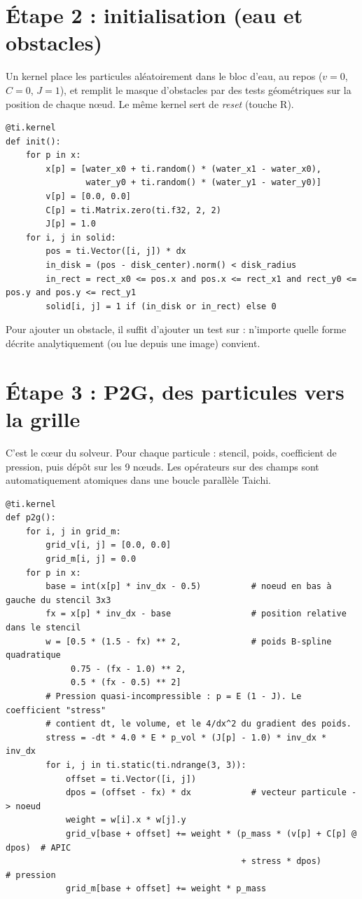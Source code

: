 \documentclass[11pt,a4paper]{article}
\newcommand{\code}[1]{\texttt{\detokenize{#1}}}
\begin{document}
\section{Étape 2 : initialisation (eau et obstacles)}

Un kernel place les particules aléatoirement dans le bloc d'eau, au repos ($v = 0$,
$C = 0$, $J = 1$), et remplit le masque d'obstacles par des tests géométriques sur la
position de chaque n\oe ud. Le même kernel sert de \emph{reset} (touche R).

\begin{lstlisting}
@ti.kernel
def init():
    for p in x:
        x[p] = [water_x0 + ti.random() * (water_x1 - water_x0),
                water_y0 + ti.random() * (water_y1 - water_y0)]
        v[p] = [0.0, 0.0]
        C[p] = ti.Matrix.zero(ti.f32, 2, 2)
        J[p] = 1.0
    for i, j in solid:
        pos = ti.Vector([i, j]) * dx
        in_disk = (pos - disk_center).norm() < disk_radius
        in_rect = rect_x0 <= pos.x and pos.x <= rect_x1 and rect_y0 <= pos.y and pos.y <= rect_y1
        solid[i, j] = 1 if (in_disk or in_rect) else 0
\end{lstlisting}

Pour ajouter un obstacle, il suffit d'ajouter un test sur \code{pos} : n'importe quelle forme
décrite analytiquement (ou lue depuis une image) convient.

\section{Étape 3 : P2G, des particules vers la grille}

C'est le c\oe ur du solveur. Pour chaque particule : stencil, poids, coefficient de pression,
puis dépôt sur les 9 n\oe uds. Les opérateurs \code{+=} sur des champs sont automatiquement
atomiques dans une boucle parallèle Taichi.

\begin{lstlisting}
@ti.kernel
def p2g():
    for i, j in grid_m:
        grid_v[i, j] = [0.0, 0.0]
        grid_m[i, j] = 0.0
    for p in x:
        base = int(x[p] * inv_dx - 0.5)          # noeud en bas à gauche du stencil 3x3
        fx = x[p] * inv_dx - base                # position relative dans le stencil
        w = [0.5 * (1.5 - fx) ** 2,              # poids B-spline quadratique
             0.75 - (fx - 1.0) ** 2,
             0.5 * (fx - 0.5) ** 2]
        # Pression quasi-incompressible : p = E (1 - J). Le coefficient "stress"
        # contient dt, le volume, et le 4/dx^2 du gradient des poids.
        stress = -dt * 4.0 * E * p_vol * (J[p] - 1.0) * inv_dx * inv_dx
        for i, j in ti.static(ti.ndrange(3, 3)):
            offset = ti.Vector([i, j])
            dpos = (offset - fx) * dx            # vecteur particule -> noeud
            weight = w[i].x * w[j].y
            grid_v[base + offset] += weight * (p_mass * (v[p] + C[p] @ dpos)  # APIC
                                               + stress * dpos)               # pression
            grid_m[base + offset] += weight * p_mass
\end{lstlisting}
\end{document}

